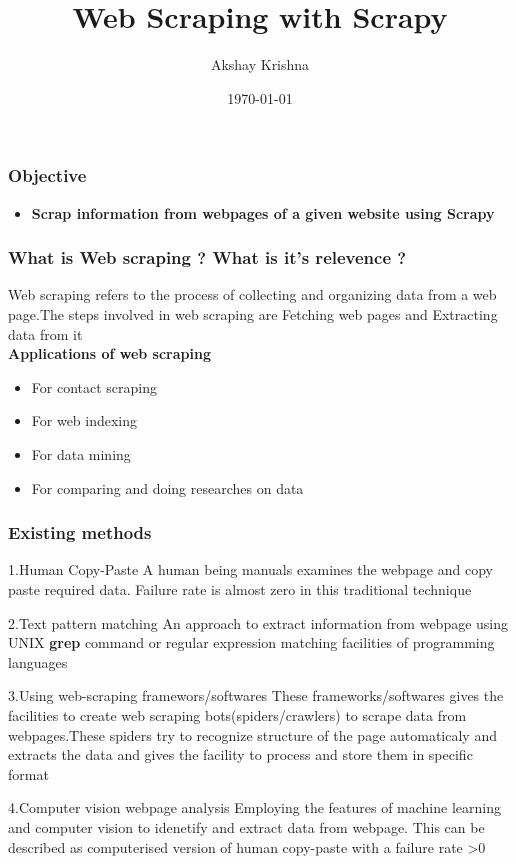\documentclass{beamer}
\title[Short title]{Web Scraping with Scrapy} %
\author{Akshay Krishna} %
\institute[] %
{
S5 CSE A \\ %
\medskip
\textit{} %
}
\date{\today} %
\begin{document}
\begin{frame}
\titlepage %
\end{frame}

\begin{frame}
\frametitle{Objective}
\begin{itemize}
\item \textbf {Scrap information from webpages of a given website using Scrapy}
\end{itemize}
\end{frame}

\begin{frame}
\frametitle{What is Web scraping ? What is it's relevence ?}
Web scraping refers to the process of collecting and organizing data from a web page.The steps involved in web scraping are Fetching web pages and Extracting data from it\\
\vspace{4mm}
\textbf{Applications of web scraping}
\begin{itemize}
\item For contact scraping
\item For web indexing
\item For data mining
\item For comparing and doing researches on data
\end{itemize}
\end{frame}

\begin{frame}
\frametitle{Existing methods}
\begin{block}{1.Human Copy-Paste}
A human being manuals examines the webpage and copy paste required data. Failure rate is almost zero in this traditional technique
\end{block}
\begin{block}{2.Text pattern matching}
An approach to extract information from webpage using UNIX \textbf{grep} command or regular expression matching facilities of programming languages
\end{block}
\end{frame}

\begin{frame}
\begin{block}{3.Using web-scraping framewors/softwares}
These frameworks/softwares gives the facilities to create web scraping bots(spiders/crawlers) to scrape data from webpages.These spiders try to recognize structure of the page automaticaly and extracts the data and gives the facility to process and store them in specific format
\end{block}

\begin{block}{4.Computer vision webpage analysis}
Employing the features of machine learning and computer vision to idenetify and extract data from webpage. This can be described as computerised version of human copy-paste with a failure rate >0
\end{block}
\end{frame}
\end{document}
